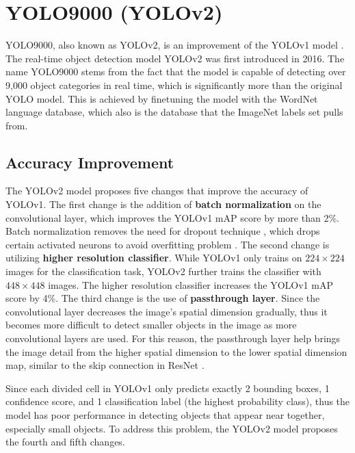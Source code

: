 \section{YOLO9000 (YOLOv2)}  \label{sec:yolov2}

YOLO9000, also known as YOLOv2, is an improvement of the YOLOv1 model \cite{yolo9000_2017}. The real-time object detection model YOLOv2 was first introduced in 2016. The name YOLO9000 stems from the fact that the model is capable of detecting over 9,000 object categories in real time,  which is significantly more than the original YOLO model. This is achieved by finetuning the model with the WordNet language database, which also is the database that the ImageNet labels set pulls from.

\subsection{Accuracy Improvement}
The YOLOv2 model proposes five changes that improve the accuracy of YOLOv1. The first change is the addition of \textbf{batch normalization} on the convolutional layer, which improves the YOLOv1 mAP score by more than 2\%. Batch normalization removes the need for dropout technique \cite{dropout_2014}, which drops certain activated neurons to avoid overfitting problem \cite{szeliski_cv_book}. The second change is utilizing \textbf{higher resolution classifier}. While YOLOv1 only trains on $224 \times 224$ images for the classification task, YOLOv2 further trains the classifier with $448 \times 448$ images. The higher resolution classifier increases the YOLOv1 mAP score by 4\%. The third change is the use of \textbf{passthrough layer}. Since the convolutional layer decreases the image's spatial dimension gradually, thus it becomes more difficult to detect smaller objects in the image as more convolutional layers are used. For this reason, the passthrough layer help brings the image detail from the higher spatial dimension to the lower spatial dimension map, similar to the skip connection in ResNet \cite{resnet_2016}.

Since each divided cell in YOLOv1 only predicts exactly 2 bounding boxes, 1 confidence score, and 1 classification label (the highest probability class), thus the model has poor performance in detecting objects that appear near together, especially small objects. To address this problem, the YOLOv2 model proposes the fourth and fifth changes. 

